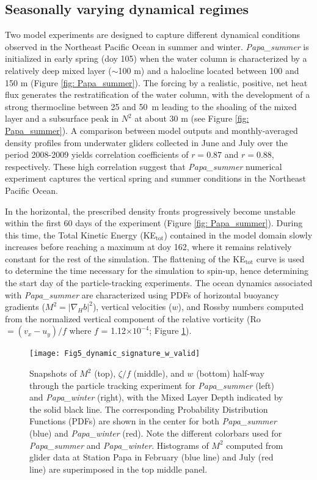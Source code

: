 \documentclass[article,linenumbers]{agujournal2018}
\begin{document}
	\subsection{Seasonally varying dynamical regimes}
	
	Two model experiments are designed to capture different dynamical conditions observed in the Northeast Pacific Ocean in summer and winter. \textit{Papa\_summer} is initialized in early spring (doy 105) when the water column is characterized by a relatively deep mixed layer ($\sim$100 m) and a halocline located between 100 and 150 m (Figure \ref{fig: Papa_summer}). The forcing by a realistic, positive, net heat flux generates the restratification of the water column, with the development of a strong thermocline between 25 and 50~m leading to the shoaling of the mixed layer and a subsurface peak in $N^2$ at about 30 m (see Figure \ref{fig: Papa_summer}). A comparison between model outputs and monthly-averaged density profiles from underwater gliders collected in June and July over the period 2008-2009 yields correlation coefficients of $r = 0.87$ and $r = 0.88$, respectively. These high correlation suggest that \textit{Papa\_summer} numerical experiment captures the vertical spring and summer conditions in the Northeast Pacific Ocean.
	
	In the horizontal, the prescribed density fronts progressively become unstable within the first 60 days of the experiment (Figure \ref{fig: Papa_summer}). During this time, the Total Kinetic Energy (KE$_{\text{tot}}$) contained in the model domain slowly increases before reaching a maximum at doy 162, where it remains relatively constant for the rest of the simulation. The flattening of the KE$_{\text{tot}}$ curve is used to determine the time necessary for the simulation to spin-up, hence determining the start day of the particle-tracking experiments. The ocean dynamics associated with \textit{Papa\_summer} are characterized using PDFs of horizontal buoyancy gradients ($M^2 = |\nabla_Hb|^2$), vertical velocities ($w$), and Rossby numbers computed from the normalized vertical component of the relative vorticity (Ro $=(v_x - u_y)/f$ where $f$ = 1.12$\times10^{-4}$; Figure \ref{fig: dynamics}).
	
	\begin{figure}[t]
		\centering
		\texttt{[image: Fig5\_dynamic\_signature\_w\_valid]}
		\caption{Snapshots of $M^2$ (top), $\zeta /f$ (middle), and $w$ (bottom) half-way through the particle tracking experiment for \textit{Papa\_summer} (left) and \textit{Papa\_winter} (right), with the Mixed Layer Depth indicated by the solid black line. The corresponding Probability Distribution Functions (PDFs) are shown in the center for both \textit{Papa\_summer} (blue) and \textit{Papa\_winter} (red). Note the different colorbars used for \textit{Papa\_summer} and \textit{Papa\_winter}. Histograms of $M^2$ computed from glider data at Station Papa in February (blue line) and July (red line) are superimposed in the top middle panel.}
		\label{fig: dynamics}
	\end{figure}
	
\end{document}
